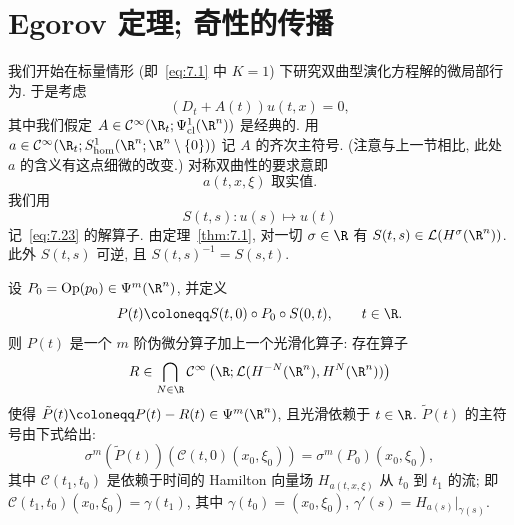 \section{Egorov 定理; 奇性的传播}\label{sec:7.2}
%
%

我们开始在标量情形 (即~\eqref{eq:7.1} 中 $K = 1$) 下研究双曲型演化方程解的微局部行为. 于是考虑
\begin{equation}\label{eq:7.23}
    (D_t + A(t)) u(t, x) = 0,
\end{equation}
其中我们假定 $A \in \Smooth(\R_t; \Psi^1_{\mathrm{cl}}(\R^n))$ 是经典的. 用 $a \in \Smooth(\R_t; S^1_{\mathrm{hom}}(\R^n; \R^n \setminus \{0\}))$ 记 $A$ 的齐次主符号. (注意与上一节相比, 此处 $a$ 的含义有这点细微的改变.) 对称双曲性的要求意即
\begin{equation}\label{eq:7.24}
    a(t, x, \xi) \text{ 取实值.}
\end{equation}
我们用
\begin{equation}\label{eq:7.25}
    S(t, s) \colon u(s) \mapsto u(t)
\end{equation}
记~\eqref{eq:7.23} 的解算子. 由定理~\ref{thm:7.1}, 对一切 $\sigma \in \R$ 有 $S(t, s) \in \mathcal{L}(H^\sigma(\R^n))$. 此外 $S(t, s)$ 可逆, 且 $S(t, s)^{-1} = S(s, t)$.

\begin{theorem}[Egorov 定理]\label{thm:7.6}
设 $P_0 = \Op(p_0) \in \Psi^m(\R^n)$, 并定义
\begin{equation}\label{eq:7.26}
    P(t) \defeq S(t, 0) \circ P_0 \circ S(0, t), \qquad t \in \R.
\end{equation}
则 $P(t)$ 是一个 $m$ 阶伪微分算子加上一个光滑化算子: 存在算子
\begin{equation*}
    R \in \bigcap_{N \in \R} \Smooth\left( \R; \mathcal{L}(H^{-N}(\R^n), H^N(\R^n)) \right)
\end{equation*}
使得 $\tilde{P}(t) \defeq P(t) - R(t) \in \Psi^m(\R^n)$, 且光滑依赖于 $t \in \R$. $\tilde{P}(t)$ 的主符号由下式给出:
\begin{equation}\label{eq:7.27}
    \sigma^m(\tilde{P}(t))\left( \mathcal{C}(t, 0)(x_0, \xi_0) \right) = \sigma^m(P_0)(x_0, \xi_0),
\end{equation}
其中 $\mathcal{C}(t_1, t_0)$ 是依赖于时间的 Hamilton 向量场 $H_{a(t, x, \xi)}$ 从 $t_0$ 到 $t_1$ 的流; 即 $\mathcal{C}(t_1, t_0)(x_0, \xi_0) = \gamma(t_1)$, 其中 $\gamma(t_0) = (x_0, \xi_0)$, $\gamma'(s) = H_{a(s)}|_{\gamma(s)}$.
\end{theorem}

